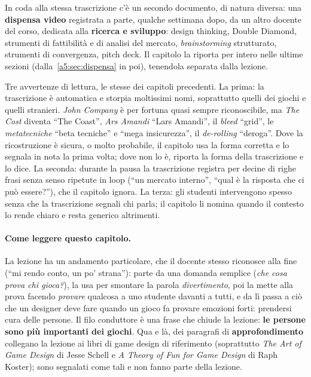 In coda alla stessa trascrizione c'è un secondo documento, di natura diversa: una
\textbf{dispensa video} registrata a parte, qualche settimana dopo, da un altro
docente del corso, dedicata alla \textbf{ricerca e sviluppo}: design thinking,
Double Diamond, strumenti di fattibilità e di analisi del mercato,
\emph{brainstorming} strutturato, strumenti di convergenza, pitch deck. Il
capitolo la riporta per intero nelle ultime sezioni
(dalla~\ref{a5:sec:dispensa} in poi), tenendola separata dalla lezione.

Tre avvertenze di lettura, le stesse dei capitoli precedenti. La prima: la
trascrizione è automatica e storpia moltissimi nomi, soprattutto quelli dei
giochi e quelli stranieri. \emph{John Company} è per fortuna quasi sempre
riconoscibile, ma \emph{The Cost} diventa ``The Coast'', \emph{Ars Amandi}
``Lars Amandi'', il \emph{bleed} ``grid'', le \emph{metatecniche} ``beta
tecniche'' e ``mega insicurezza'', il \emph{de-rolling} ``deroga''. Dove la
ricostruzione è sicura, o molto probabile, il capitolo usa la forma corretta e lo
segnala in nota la prima volta; dove non lo è, riporta la forma della trascrizione
e lo dice. La seconda: durante la pausa la trascrizione registra per decine di
righe frasi senza senso ripetute in loop (``un mercato interno'', ``qual è la
risposta che ci può essere?''), che il capitolo ignora. La terza: gli studenti
intervengono spesso senza che la trascrizione segnali chi parla; il capitolo li
nomina quando il contesto lo rende chiaro e resta generico altrimenti.

\paragraph{Come leggere questo capitolo.} La lezione ha un andamento
particolare, che il docente stesso riconosce alla fine (``mi rendo conto, un po'
strana''): parte da una domanda semplice (\emph{che cosa prova chi gioca?}), la
usa per smontare la parola \emph{divertimento}, poi la mette alla prova facendo
\emph{provare} qualcosa a uno studente davanti a tutti, e da lì passa a ciò che
un designer deve fare quando un gioco fa provare emozioni forti: prendersi cura
delle persone. Il filo conduttore è una frase che chiude la lezione: \textbf{le
persone sono più importanti dei giochi}. Qua e là, dei paragrafi di
\textbf{approfondimento} collegano la lezione ai libri di game design di
riferimento (soprattutto \emph{The Art of Game Design} di Jesse Schell e \emph{A
Theory of Fun for Game Design} di Raph Koster); sono segnalati come tali e non
fanno parte della lezione.

